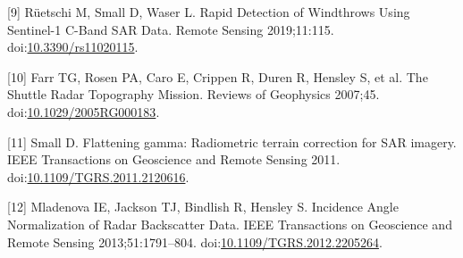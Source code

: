 \documentclass[]{elsarticle} %
\begin{document}
\leavevmode\hypertarget{ref-Ruetschi2019}{}%
{[}9{]} Rüetschi M, Small D, Waser L. Rapid Detection of Windthrows
Using Sentinel-1 C-Band SAR Data. Remote Sensing 2019;11:115.
doi:\href{https://doi.org/10.3390/rs11020115}{10.3390/rs11020115}.

\leavevmode\hypertarget{ref-Farr_Rosen2007}{}%
{[}10{]} Farr TG, Rosen PA, Caro E, Crippen R, Duren R, Hensley S, et
al. The Shuttle Radar Topography Mission. Reviews of Geophysics 2007;45.
doi:\href{https://doi.org/10.1029/2005RG000183}{10.1029/2005RG000183}.

\leavevmode\hypertarget{ref-Small2011}{}%
{[}11{]} Small D. Flattening gamma: Radiometric terrain correction for
SAR imagery. IEEE Transactions on Geoscience and Remote Sensing 2011.
doi:\href{https://doi.org/10.1109/TGRS.2011.2120616}{10.1109/TGRS.2011.2120616}.

\leavevmode\hypertarget{ref-Mladenova2013}{}%
{[}12{]} Mladenova IE, Jackson TJ, Bindlish R, Hensley S. Incidence
Angle Normalization of Radar Backscatter Data. IEEE Transactions on
Geoscience and Remote Sensing 2013;51:1791--804.
doi:\href{https://doi.org/10.1109/TGRS.2012.2205264}{10.1109/TGRS.2012.2205264}.
\end{document}
